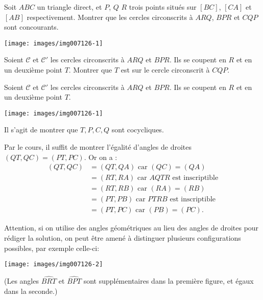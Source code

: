 \begin{exo} %
Soit $ABC$ un triangle direct, et $P$, $Q$ $R$ trois points situés sur $[BC]$, $[CA]$ et $[AB]$ respectivement. Montrer que les cercles circonscrits à $ARQ$, $BPR$ et $CQP$ sont concourants.

\begin{center}
\texttt{[image: images/img007126-1]}
\end{center}


\begin{hint}   
Soient $\mathcal C$ et $\mathcal C'$ les cercles circonscrits à $ARQ$ et $BPR$. 
Ils se coupent en $R$ et en un deuxième point $T$. Montrer que $T$ est sur le cercle circonscrit à $CQP$.
\end{hint}      

\begin{sol} 



Soient $\mathcal C$ et $\mathcal C'$ les cercles circonscrits à $ARQ$ et $BPR$. 
Ils se coupent en $R$ et en un deuxième point $T$.

\begin{center}
\texttt{[image: images/img007126-1]}
\end{center}

Il s'agit de montrer que $T, P, C, Q$ sont cocycliques.


Par le cours,  il suffit de montrer l'égalité d'angles de droites $(QT,QC)=(PT,PC)$. Or on a :
\begin{align*}
(QT,QC)&=(QT,QA) \text{ car $(QC)=(QA)$}\\
&=(RT,RA) \text{ car $AQTR$ est inscriptible} \\
&= (RT,RB) \text{ car $(RA)=(RB)$} \\
&=(PT,PB) \text{ car $PTRB$ est inscriptible} \\
&=(PT,PC) \text{ car $(PB)=(PC)$.}
\end{align*}

Attention, si on utilise des angles géométriques au lieu des angles de droites pour rédiger la solution, on peut être amené à distinguer plusieurs configurations possibles, par exemple celle-ci:
\begin{center}
\texttt{[image: images/img007126-2]}
\end{center}

(Les angles $\widehat{BRT}$ et $\widehat{BPT}$ sont supplémentaires dans la première figure, et égaux dans la seconde.)

\end{sol}  
\end{exo}  



